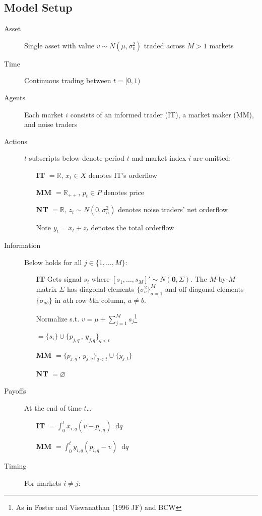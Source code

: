 \documentclass{scrartcl}
\newcommand*\diff{\mathop{}\!\mathrm{d}}
\def\uni{\cup}
\begin{document}
			\subsection*{Model Setup}
			\begin{description}
				\item[Asset] Single asset with value $v \sim N(\mu,\sigma_v^2) $ traded across $M > 1$ markets
				\item[Time] Continuous trading between $t = [0,1)$
				\item[Agents] Each market $i$ consists of an informed trader (IT), a market maker (MM), and noise traders
				\item[Actions] $t$ subscripts below denote period-$t$ and market index $i$ are omitted:
				\begin{enumerate}
					\item[\textbf{IT}]  $= \mathbb{R} $, $x_t \in X $ denotes IT's orderflow
					\item[\textbf{MM}]  $= \mathbb{R}_{++} $, $p_t \in P $ denotes price
					\item[\textbf{NT}]  $= \mathbb{R},\, z_t \sim N(0,\sigma^2_n) $ denotes noise traders' net orderflow
					\item[Note] $y_t = x_t + z_t$ denotes the total orderflow
				\end{enumerate}
				\item[Information] Below holds for all $j\in\{1,\ldots,M\} $:
				\begin{enumerate} 
					\item[\textbf{IT}] Gets signal $s_i $ where $ [s_1,\ldots,s_M]' \sim N(\mathbf{0},\Sigma) $. The $M$-by-$M$ matrix $\Sigma$ has diagonal elements $\{\sigma_a^2\}_{a=1}^M $ and off diagonal elements $\{\sigma_{ab}\} $ in $a$th row $b$th column, $a \neq b$.
					\item[] Normalize s.t. $v = \mu + \sum_{j=1}^M s_j $\footnote{As in Foster and Viswanathan (1996 JF) and BCW}
					\item[]  $= \{s_i\}\uni\{p_{j,q}\,,\,y_{j,q}\}_{q<t} $
					\item[\textbf{MM}]  $= \{p_{j,q}\,,\,y_{j,q}\}_{q<t} \uni \{y_{j,t}\} $
					\item[\textbf{NT}]  $= \varnothing $
				\end{enumerate}
				\item[Payoffs] At the end of time $t$\dots
				\begin{enumerate}
					\item[\textbf{IT}]  $ = \int_0^t x_{i,q}(v - p_{i,q})\diff q $
					\item[\textbf{MM}]  $ = \int_0^t y_{i,q}(p_{i,q} - v)\diff q $
				\end{enumerate}
				\item[Timing] For markets $i\neq j$:\\
			\end{description}
\end{document}
